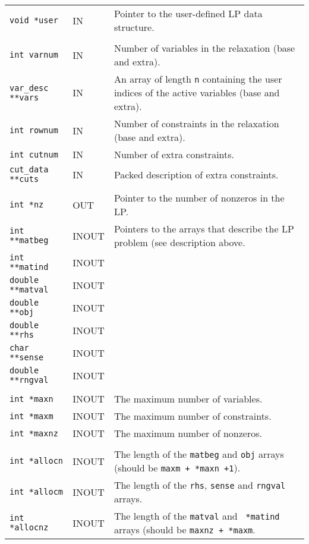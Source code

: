 \documentclass[twoside,11pt]{article}
\begin{document}
{\newpage
\clearpage
\samepage \begin{tabular}{llp{257pt}}
{\tt void *user} & IN & Pointer to the user-defined LP data structure. \\ 
& & \\ 

{\tt int varnum} & IN & Number of variables in the relaxation (base
and extra). \\ 

{\tt var\_desc **vars} & IN & An array of length {\tt n} containing the user
indices of the active variables (base and extra). \\ 

{\tt int rownum} & IN & Number of constraints in the relaxation (base
and extra). \\ 

{\tt int cutnum} & IN & Number of extra constraints. \\ 

{\tt cut\_data **cuts} & IN & Packed description of extra constraints. \\ 
& & \\ 

{\tt int *nz} & OUT &  Pointer to the number of nonzeros in the LP.\\ 

{\tt int **matbeg} & INOUT & Pointers to the arrays that describe the LP
problem (see description above. \\ 
{\tt int **matind} & INOUT & \\ 
{\tt double **matval} & INOUT & \\ 
{\tt double **obj} & INOUT & \\ 
{\tt double **rhs} & INOUT & \\ 
{\tt char **sense} & INOUT & \\ 
{\tt double **rngval} & INOUT & \\ 
& & \\ 
{\tt int *maxn} & INOUT & The maximum number of variables.\\ 
{\tt int *maxm} & INOUT & The maximum number of constraints.\\ 
{\tt int *maxnz} & INOUT & The maximum number of nonzeros. \\ 
& & \\ 
{\tt int *allocn} & INOUT & The length of the {\tt *matbeg} and {\tt *obj}
arrays (should be {\tt *maxm + *maxn +1}). \\ 
{\tt int *allocm} & INOUT & The length of the {\tt *rhs}, {\tt *sense}
and {\tt *rngval} arrays. \\ 
{\tt int *allocnz} & INOUT & The length of the {\tt *matval} and {\tt
*matind} arrays (should be {\tt *maxnz + *maxm}. \\ 
\end{tabular}
}
\end{document}
